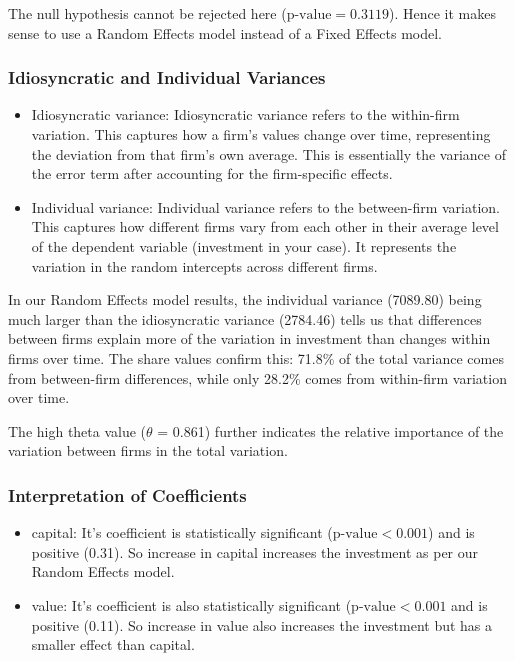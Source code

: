 \documentclass[a4paper]{article}
\begin{document}
The null hypothesis cannot be rejected here (\(\text{p-value} = 0.3119\)). Hence it makes sense to use a Random Effects model instead of a Fixed Effects model.

\subsubsection*{\textbf{Idiosyncratic and Individual Variances}}
\begin{itemize}
    \item Idiosyncratic variance: Idiosyncratic variance refers to the within-firm variation. This captures how a firm's values change over time, representing the deviation from that firm's own average. This is essentially the variance of the error term after accounting for the firm-specific effects.
    \item Individual variance: Individual variance refers to the between-firm variation. This captures how different firms vary from each other in their average level of the dependent variable (investment in your case). It represents the variation in the random intercepts across different firms.
\end{itemize}

In our Random Effects model results, the individual variance (7089.80) being much larger than the idiosyncratic variance (2784.46) tells us that differences between firms explain more of the variation in investment than changes within firms over time. The share values confirm this: 71.8\% of the total variance comes from between-firm differences, while only 28.2\% comes from within-firm variation over time.

The high theta value (\(\theta\) = 0.861) further indicates the relative importance of the variation between firms in the total variation. 

\subsubsection*{\textbf{Interpretation of Coefficients}}
\begin{itemize}
    \item capital: It's coefficient is statistically significant (\(\text{p-value}<0.001\)) and is positive (0.31). So increase in capital increases the investment as per our Random Effects model.
    \item value: It's coefficient is also statistically significant (\(\text{p-value}<0.001\) and is positive (0.11). So increase in value also increases the investment but has a smaller effect than capital.
\end{itemize}

\end{document}
